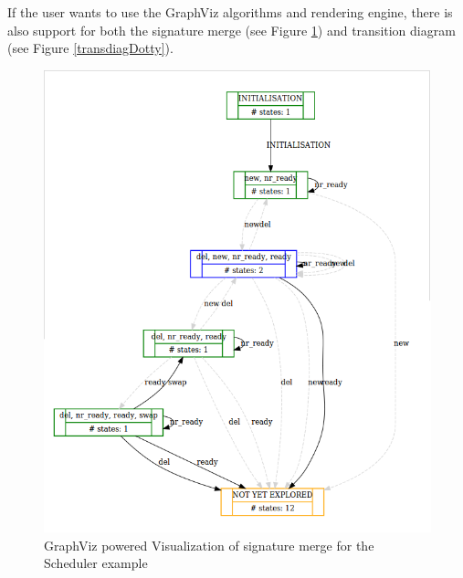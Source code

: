 If the user wants to use the GraphViz algorithms and rendering engine, there is also support for both the signature merge (see Figure \ref{sigmergeDotty}) and transition diagram (see Figure \ref{transdiagDotty}).

\begin{figure}[h!]
\centering
\includegraphics[width=14cm]{bilder/dotty-sigmerge.png}
\caption{GraphViz powered Visualization of signature merge for the Scheduler example}
\label{sigmergeDotty}
\end{figure}

